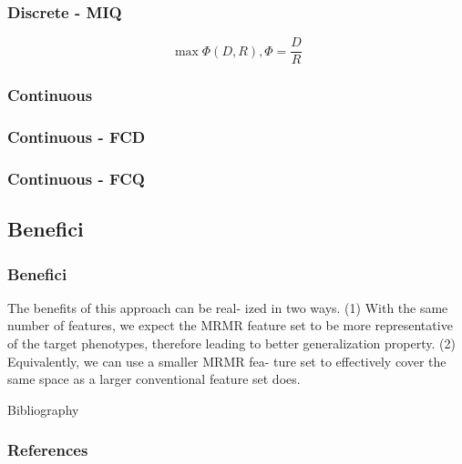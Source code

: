 \documentclass{beamer}
\begin{document}
\begin{frame}
	\frametitle{Discrete - MIQ}
	$$\max \Phi(D,R), \Phi = \frac{D}{R}$$
\end{frame}
\begin{frame}
	\frametitle{Continuous}
\end{frame}
\begin{frame}
	\frametitle{Continuous - FCD}
\end{frame}

\begin{frame}
	\frametitle{Continuous - FCQ}
\end{frame}

\subsection{Benefici}
\begin{frame}
	\frametitle{Benefici}
	The benefits of this approach can be real-
	ized in two ways. (1) With the same number of features, we expect the MRMR
	feature set to be more representative of the target phenotypes, therefore leading to
	better generalization property. (2) Equivalently, we can use a smaller MRMR fea-
	ture set to effectively cover the same space as a larger conventional feature set does.
\end{frame}

\begin{frame}{Bibliography}
	\frametitle{References}
	
	
\end{frame}
\end{document}
